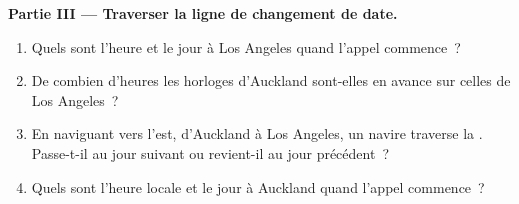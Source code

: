 \begin{problem}
\medskip
\noindent\textbf{Partie III --- Traverser la ligne de changement de date.}
\begin{enumerate}[resume]
  \item Quels sont l'heure et le jour à Los Angeles quand l'appel
        commence~?
  \item De combien d'heures les horloges d'Auckland sont-elles en avance
        sur celles de Los Angeles~?
  \item En naviguant vers l'est, d'Auckland à Los Angeles, un navire
        traverse la . Passe-t-il au jour suivant
        ou revient-il au jour précédent~?
  \item Quels sont l'heure locale et le jour à Auckland quand l'appel
        commence~?
\end{enumerate}
\end{problem}
